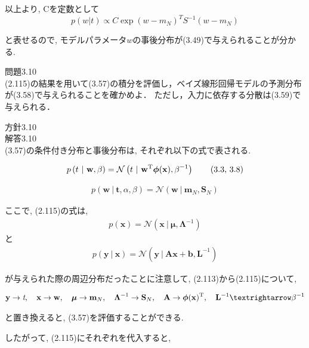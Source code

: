 \documentclass{jsarticle}
\begin{document}
以上より, Cを定数として
\[
    p(w|t) \propto C \exp {(w-m_N)^TS^{-1}(w-m_N)} 
    \]

と表せるので, モデルパラメータ$w$の事後分布が(3.49)で与えられることが分かる.

問題3.10 \\

(2.115)の結果を用いて(3.57)の積分を評価し，ベイズ線形回帰モデルの予測分布が(3.58)で与えられることを確かめよ．
ただし，入力に依存する分散は(3.59)で与えられる．

方針3.10 \\


解答3.10 \\
(3.57)の条件付き分布と事後分布は, それぞれ以下の式で表される.

\begin{align*}
p \left (t ~ | ~ \mathbf w,\beta \right ) = \mathcal { N } \left (t ~ | ~ \mathbf w^\textrm T \boldsymbol \phi (\mathbf x),\beta^{-1} \right ) 
\tag{3.3, 3.8}
\end{align*}

\begin{align*}
p \left (\mathbf w ~ | ~ \mathbf t,\alpha,\beta \right ) = \mathcal { N } \left (\mathbf w ~ | ~ \mathbf m _ N,\mathbf S_N \right )
\tag{3.49}
\end{align*}

ここで, (2.115)の式は, 
\begin{align*}
p \left (\mathbf x \right ) = \mathcal { N } \left (\mathbf { x } ~ | ~ \boldsymbol \mu ,\boldsymbol \Lambda^{-1} \right ) 
\tag{2.113}
\end{align*}
と
\begin{align*}
p \left (\mathbf y ~ | ~ \mathbf x \right ) = \mathcal { N } \left (\mathbf y ~ | ~ \mathbf A \mathbf x + \mathbf b,\mathbf L^{-1} \right ) 
\tag{2.114}
\end{align*}

が与えられた際の周辺分布だったことに注意して, (2.113)から(2.115)について, 

\begin{align*}
\mathbf y \rightarrow \textit t, \quad \mathbf x \rightarrow \mathbf w, \quad \boldsymbol \mu \rightarrow \mathbf m_N, \quad \boldsymbol \Lambda^{-1} \rightarrow \mathbf S_N,\quad  \mathbf A \rightarrow \boldsymbol \phi (\mathbf x)^\textrm T,\quad \mathbf L^{-1}→\beta^{-1}
\end{align*}

と置き換えると, (3.57)を評価することができる.

したがって, (2.115)にそれぞれを代入すると,
\end{document}
